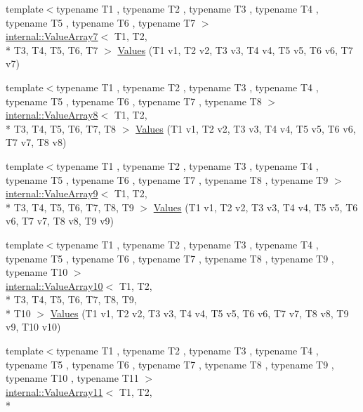 \begin{DoxyCompactItemize}
\item 
{\footnotesize template$<$typename T1 , typename T2 , typename T3 , typename T4 , typename T5 , typename T6 , typename T7 $>$ }\\\hyperlink{classtesting_1_1internal_1_1_value_array7}{internal\-::\-Value\-Array7}$<$ T1, T2, \\*
T3, T4, T5, T6, T7 $>$ \hyperlink{namespacetesting_a8fe9ae088304ebc64de1b076951e6eb8}{Values} (T1 v1, T2 v2, T3 v3, T4 v4, T5 v5, T6 v6, T7 v7)
\item 
{\footnotesize template$<$typename T1 , typename T2 , typename T3 , typename T4 , typename T5 , typename T6 , typename T7 , typename T8 $>$ }\\\hyperlink{classtesting_1_1internal_1_1_value_array8}{internal\-::\-Value\-Array8}$<$ T1, T2, \\*
T3, T4, T5, T6, T7, T8 $>$ \hyperlink{namespacetesting_a1eda12e6518e4c51c1bb2e7cc9d31ffa}{Values} (T1 v1, T2 v2, T3 v3, T4 v4, T5 v5, T6 v6, T7 v7, T8 v8)
\item 
{\footnotesize template$<$typename T1 , typename T2 , typename T3 , typename T4 , typename T5 , typename T6 , typename T7 , typename T8 , typename T9 $>$ }\\\hyperlink{classtesting_1_1internal_1_1_value_array9}{internal\-::\-Value\-Array9}$<$ T1, T2, \\*
T3, T4, T5, T6, T7, T8, T9 $>$ \hyperlink{namespacetesting_ab663e13807ad5cc223814797c9191a58}{Values} (T1 v1, T2 v2, T3 v3, T4 v4, T5 v5, T6 v6, T7 v7, T8 v8, T9 v9)
\item 
{\footnotesize template$<$typename T1 , typename T2 , typename T3 , typename T4 , typename T5 , typename T6 , typename T7 , typename T8 , typename T9 , typename T10 $>$ }\\\hyperlink{classtesting_1_1internal_1_1_value_array10}{internal\-::\-Value\-Array10}$<$ T1, T2, \\*
T3, T4, T5, T6, T7, T8, T9, \\*
T10 $>$ \hyperlink{namespacetesting_a2948b0215fce80155fdbad4e3608f4cd}{Values} (T1 v1, T2 v2, T3 v3, T4 v4, T5 v5, T6 v6, T7 v7, T8 v8, T9 v9, T10 v10)
\item 
{\footnotesize template$<$typename T1 , typename T2 , typename T3 , typename T4 , typename T5 , typename T6 , typename T7 , typename T8 , typename T9 , typename T10 , typename T11 $>$ }\\\hyperlink{classtesting_1_1internal_1_1_value_array11}{internal\-::\-Value\-Array11}$<$ T1, T2, \\*

\end{DoxyCompactItemize}
